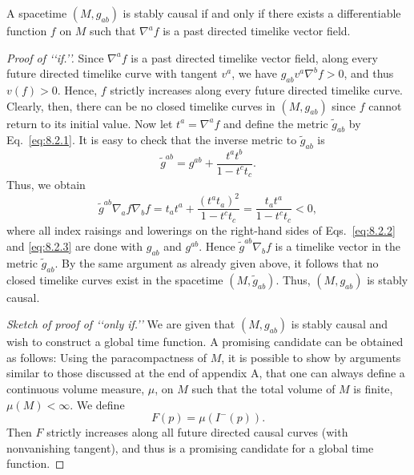 \begin{theorem}\label{thm:8.2.2}
A spacetime \((M,g_{ab})\) is stably causal if and only if there exists a
differentiable function \(f\) on \(M\) such that \(\nabla^af\) is a past directed
timelike vector field.
\end{theorem}
\begin{proof}[Proof of \lq\lq if.\rq\rq]
Since \(\nabla^af\) is a past directed timelike vector field, along every future
directed timelike curve with tangent \(v^a\), we have
\(g_{ab}v^a\nabla^bf>0\), and thus \(v(f)>0\). Hence, \(f\) strictly increases
along every future directed timelike curve. Clearly, then, there can be no closed
timelike curves in \((M,g_{ab})\) since \(f\) cannot return to its initial value.
Now let \(t^a=\nabla^af\) and define the metric \(\widetilde g_{ab}\) by
Eq.~\eqref{eq:8.2.1}. It is easy to check that the inverse metric to
\(\widetilde g_{ab}\) is
\begin{equation}
  \widetilde g^{ab}=g^{ab}+\frac{t^at^b}{1-t^ct_c}.
  \tag{8.2.2}\label{eq:8.2.2}
\end{equation}
Thus, we obtain
\begin{equation}
  \widetilde g^{ab}\nabla_af\nabla_bf
    =t_at^a+\frac{(t^at_a)^2}{1-t^ct_c}
    =\frac{t_at^a}{1-t^ct_c}<0,
  \tag{8.2.3}\label{eq:8.2.3}
\end{equation}
where all index raisings and lowerings on the right-hand sides of
Eqs.~\eqref{eq:8.2.2} and \eqref{eq:8.2.3} are done with \(g_{ab}\) and \(g^{ab}\).
Hence \(\widetilde g^{ab}\nabla_bf\) is a timelike vector in the metric
\(\widetilde g_{ab}\). By the same argument as already given above, it follows that
no closed timelike curves exist in the spacetime \((M,\widetilde g_{ab})\). Thus,
\((M,g_{ab})\) is stably causal.
\par\medskip
\noindent\emph{Sketch of proof of \lq\lq only if.\rq\rq}
We are given that \((M,g_{ab})\) is stably causal and wish to construct a global
time function. A promising candidate can be obtained as follows: Using the
paracompactness of \(M\), it is possible to show by arguments similar to those
discussed at the end of appendix A, that one can always define a continuous volume
measure, \(\mu\), on \(M\) such that the total volume of \(M\) is finite,
\(\mu(M)<\infty\). We define
\begin{equation}
  F(p)=\mu(I^-(p)).
  \tag{8.2.4}\label{eq:8.2.4}
\end{equation}
Then \(F\) strictly increases along all future directed causal curves (with
nonvanishing tangent), and thus is a promising candidate for a global time function.

\end{proof}
